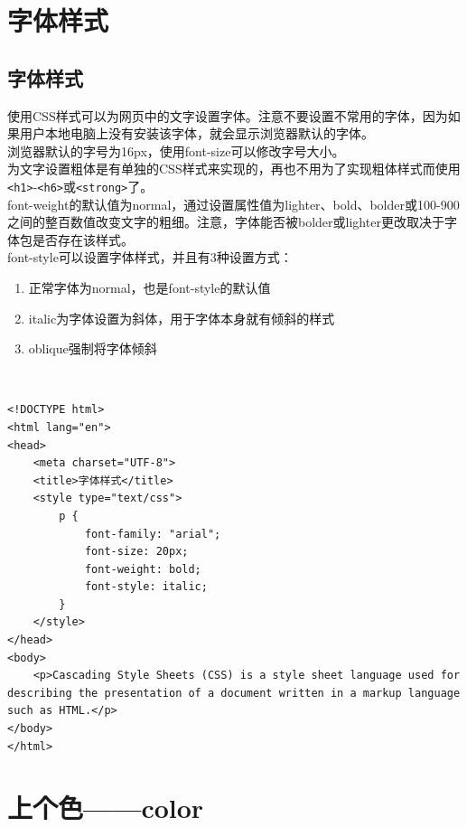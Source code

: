 \section{字体样式}

\subsection{字体样式}

使用CSS样式可以为网页中的文字设置字体。注意不要设置不常用的字体，因为如果用户本地电脑上没有安装该字体，就会显示浏览器默认的字体。 \\

浏览器默认的字号为16px，使用font-size可以修改字号大小。 \\

为文字设置粗体是有单独的CSS样式来实现的，再也不用为了实现粗体样式而使用\lstinline|<h1>|-\lstinline|<h6>|或\lstinline|<strong>|了。 \\

font-weight的默认值为normal，通过设置属性值为lighter、bold、bolder或100-900之间的整百数值改变文字的粗细。注意，字体能否被bolder或lighter更改取决于字体包是否存在该样式。 \\

font-style可以设置字体样式，并且有3种设置方式：

\begin{enumerate}
    \item 正常字体为normal，也是font-style的默认值
    \item italic为字体设置为斜体，用于字体本身就有倾斜的样式
    \item oblique强制将字体倾斜
\end{enumerate}

 \\
\begin{lstlisting}[style=htmlcssjs]
<!DOCTYPE html>
<html lang="en">
<head>
    <meta charset="UTF-8">
    <title>字体样式</title>
    <style type="text/css">
        p {
            font-family: "arial";
            font-size: 20px;
            font-weight: bold;
            font-style: italic;
        }   
    </style>
</head>
<body>
    <p>Cascading Style Sheets (CSS) is a style sheet language used for describing the presentation of a document written in a markup language such as HTML.</p>
</body>
</html>
\end{lstlisting}

\newpage

\section{上个色——color}


